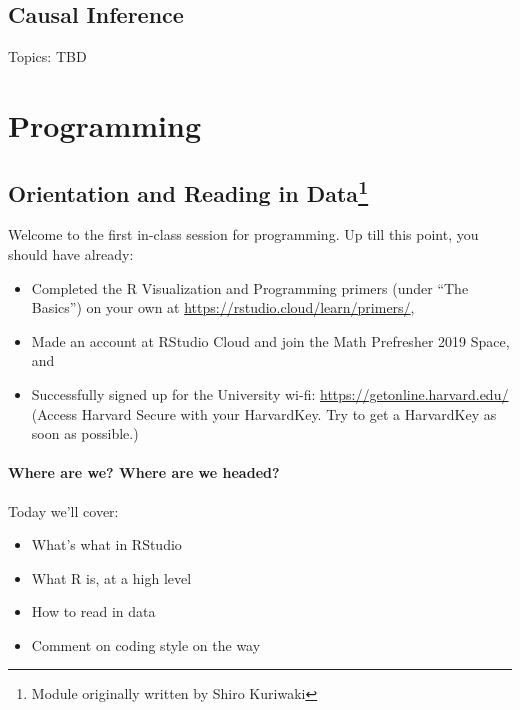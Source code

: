 \documentclass[]{book}
\providecommand{\tightlist}{%
  \setlength{\itemsep}{0pt}\setlength{\parskip}{0pt}}
\let\rmarkdownfootnote\footnote%
\def\footnote{\protect\rmarkdownfootnote}
\theoremstyle{definition}
\theoremstyle{definition}
\theoremstyle{definition}
\theoremstyle{remark}
\begin{document}
\chapter{Causal Inference}\label{causal}

Topics: TBD

\part{Programming}\label{part-programming}

\chapter[Orientation and Reading in Data]{\texorpdfstring{Orientation
and Reading in Data\footnote{Module originally written by Shiro Kuriwaki}}{Orientation and Reading in Data}}\label{dataimport}

Welcome to the first in-class session for programming. Up till this
point, you should have already:

\begin{itemize}
\tightlist
\item
  Completed the R Visualization and Programming primers (under ``The
  Basics'') on your own at \url{https://rstudio.cloud/learn/primers/},
\item
  Made an account at RStudio Cloud and join the Math Prefresher 2019
  Space, and
\item
  Successfully signed up for the University wi-fi:
  \url{https://getonline.harvard.edu/} (Access Harvard Secure with your
  HarvardKey. Try to get a HarvardKey as soon as possible.)
\end{itemize}

\subsection*{Where are we? Where are we
headed?}\label{where-are-we-where-are-we-headed}

Today we'll cover:

\begin{itemize}
\tightlist
\item
  What's what in RStudio
\item
  What R is, at a high level
\item
  How to read in data
\item
  Comment on coding style on the way
\end{itemize}
\end{document}
